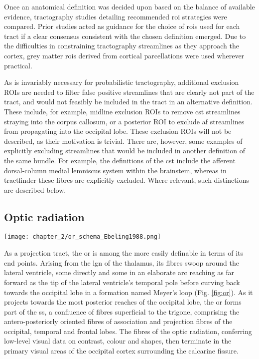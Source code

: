 Once an anatomical definition was decided upon based on the balance of available evidence, tractography studies detailing recommended \gls{roi} strategies were compared.
Prior studies acted as guidance for the choice of \glspl{roi} used for each tract if a clear consensus consistent with the chosen definition emerged.
Due to the difficulties in constraining tractography streamlines as they approach the cortex, grey matter \glspl{roi} derived from cortical parcellations were used wherever practical.

As is invariably necessary for probabilistic tractography, additional exclusion ROIs are needed to filter false positive streamlines that are clearly not part of the tract, and would not feasibly be included in the tract in an alternative definition.
These include, for example, midline exclusion ROIs to remove \gls{cst} streamlines straying into the corpus callosum, or a posterior ROI to exclude \gls{af} streamlines from propagating into the occipital lobe.
These exclusion ROIs will not be described, as their motivation is trivial.
There are, however, some examples of explicitly excluding streamlines that would be included in another definition of the same bundle.
For example, the definitions of the \gls{cst} include the afferent dorsal-column medial lemniscus system within the brainstem, whereas in tractfinder these fibres are explicitly excluded.
Where relevant, such distinctions are described below.

\subsection{Optic radiation}

\begin{SCfigure}[][htb!]
  \texttt{[image: chapter\_2/or\_schema\_Ebeling1988.png]}
  \caption{ Schematic of optic radiation, from \textcite{Ebeling1988}}
  \label{fig:or}
\end{SCfigure}

As a projection tract, the \gls{or} is among the more easily definable in terms of its end points.
Arising from the \gls{lgn} of the thalamus, its fibres swoop around the lateral ventricle, some directly and some in an elaborate arc reaching as far forward as the tip of the lateral ventricle's temporal pole before curving back towards the occipital lobe in a formation named Meyer's loop (Fig. \ref{fig:or}).\autocite{Sarubbo2015}
As it projects towards the most posterior reaches of the occipital lobe, the \gls{or} forms part of the \gls{ss}, a confluence of fibres superficial to the \gls{trigone}, comprising the antero-posteriorly oriented fibres of association and projection fibres of the occipital, temporal and frontal lobes.\autocite{Maldonado2021}
The fibres of the optic radiation, conferring low-level visual data on contrast, colour and shapes, then terminate in the primary visual areas of the occipital cortex surrounding the calcarine fissure.

